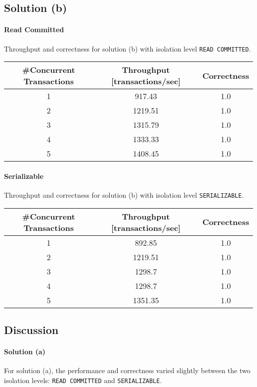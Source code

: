 \documentclass[11pt]{scrartcl}
\begin{document}
\subsection*{Solution (b)}

\paragraph{Read Committed}

Throughput and correctness for solution (b) with isolation level \lstinline[style=dbtsql]{READ COMMITTED}.

\begin{table}[H]
  \centering
  \begin{tabular}{c|c|c}
    \#Concurrent Transactions & Throughput [transactions/sec] & Correctness
      \tabularnewline
    \hline
    1 & 917.43 & 1.0 \tabularnewline
    2 & 1219.51 & 1.0 \tabularnewline
    3 & 1315.79 & 1.0 \tabularnewline
    4 & 1333.33 & 1.0 \tabularnewline
    5 & 1408.45 & 1.0 \tabularnewline
  \end{tabular}
\end{table}

\paragraph{Serializable}

Throughput and correctness for solution (b) with isolation level \lstinline[style=dbtsql]{SERIALIZABLE}.

\begin{table}[H]
  \centering
  \begin{tabular}{c|c|c}
    \#Concurrent Transactions & Throughput [transactions/sec] & Correctness
      \tabularnewline
    \hline
    1 & 892.85 & 1.0 \tabularnewline
    2 & 1219.51 & 1.0 \tabularnewline
    3 & 1298.7 & 1.0 \tabularnewline
    4 & 1298.7 & 1.0 \tabularnewline
    5 & 1351.35 & 1.0 \tabularnewline
  \end{tabular}
\end{table}

\subsection*{Discussion}

\paragraph{Solution (a)}

For solution (a), the performance and correctness varied slightly between the two isolation levels:
\lstinline[style=dbtsql]{READ COMMITTED} and \lstinline[style=dbtsql]{SERIALIZABLE}.
\end{document}

